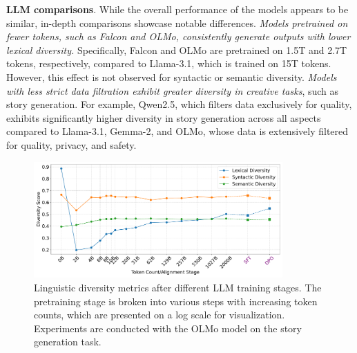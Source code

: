 \documentclass[11pt,a4paper]{article}
\begin{document}
\smallskip
\noindent\textbf{LLM comparisons}.
While the overall performance of the models appears to be similar, in-depth comparisons showcase notable differences.		
\textit{Models pretrained on fewer tokens, such as Falcon and OLMo, consistently generate outputs with lower lexical diversity.} Specifically, Falcon and OLMo are pretrained on 1.5T and 2.7T tokens, respectively, compared to Llama-3.1, which is trained on 15T tokens.
However, this effect is not observed for syntactic or semantic diversity.
\textit{Models with less strict data filtration exhibit greater diversity in creative tasks}, such as story generation.	
For example, Qwen2.5, which filters data exclusively for quality, exhibits significantly higher diversity in story generation across all aspects compared to Llama-3.1, Gemma-2, and OLMo, whose data is extensively filtered for quality, privacy, and safety.


\begin{figure}[ht]
    \centering
    \includegraphics[width=0.85\textwidth]{figures/olmo_diversity_plot.pdf}
    \caption{Linguistic diversity metrics after different LLM training stages. The pretraining stage is broken into various steps with increasing token counts, which are presented on a log scale for visualization. Experiments are conducted with the OLMo model on the story generation task.}
    \label{fig:olmo}
\end{figure}
\end{document}
